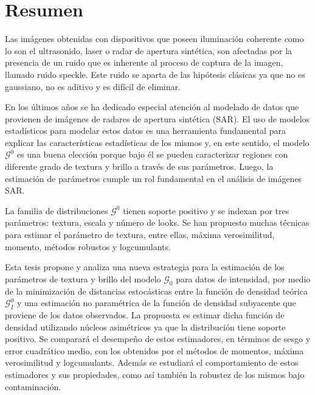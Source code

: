 
\chapter{Resumen}

Las imágenes obtenidas con dispositivos que poseen iluminación coherente como lo son el ultrasonido, laser o radar de apertura sintética, son afectadas por la presencia de un ruido que es inherente al proceso de captura de la imagen, llamado ruido speckle. Este ruido se aparta de las hipótesis clásicas ya que no es gaussiano, no es aditivo y es difícil de eliminar. 

En los últimos años se ha dedicado especial atención al modelado de datos que provienen de imágenes de radares de apertura sintética (SAR). El uso de modelos estadísticos para modelar estos datos es una herramienta fundamental para explicar las características estadísticas de los mismos y, en este sentido, el modelo $\mathcal{G}^0$ es una buena elección porque bajo él se pueden caracterizar regiones con diferente grado de textura y brillo a través de sus parámetros. Luego, la estimación de parámetros cumple un rol fundamental en el análisis de imágenes SAR.  

La familia de distribuciones $\mathcal{G}^0$  tienen soporte positivo y se indexan por tres parámetros: textura, escala y número de looks. %
Se han propuesto muchas técnicas para estimar el parámetro de textura, entre ellas, máxima verosimilitud, momento, métodos robustos y logcumulants.

Esta tesis propone y analiza una nueva estrategia para la estimación de los parámetros de textura y brillo del modelo $\mathcal G_0$ para datos de intensidad, por medio de la minimización de distancias estocásticas entre la función de densidad teórica $\mathcal{G}_I^0$ y una estimación no paramétrica de la función de densidad subyacente que proviene de los datos observados. La propuesta es estimar dicha función de densidad utilizando núcleos asimétricos ya que la distribución tiene soporte positivo. Se comparará el desempeño de estos estimadores, en términos de sesgo y error cuadrático medio, con los obtenidos por el métodos de momentos, máxima verosimilitud y logcumulants. Además se estudiará el comportamiento de estos estimadores y sus
propiedades, como así también la robustez de los mismos bajo contaminación.
